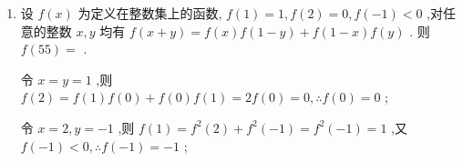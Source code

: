 \begin{enumerate}
\begin{jieda}
         令 $y = 1$ 得 $f\left( {x + 1}\right)  + f\left( {x - 1}\right)  = f\left( x\right) f\left( 1\right)  = f\left( x\right)$ ,
        
        所以 $f\left( {x + 1}\right)  = f\left( x\right)  - f\left( {x - 1}\right)$ ,则 $f\left( {x + 2}\right)  = f\left( {x + 1}\right)  - f\left( x\right)$ ,
        
        $f\left( {x + 3}\right)  = f\left( {x + 2}\right)  - f\left( {x + 1}\right)  =  - f\left( x\right) ,$
        
        
        
        所以 $f\left( {x + 6}\right)  = f\left( {x + 3 + 3}\right)  =  - f\left( {x + 3}\right)  =  - \left( {-f\left( x\right) }\right)  = f\left( x\right)$ ,
        
        所以 $f\left( x\right)$ 是周期为 6 的周期函数.
        
        令 $x = 1,y = 0$ ,则 $f\left( 1\right)  + f\left( 1\right)  = f\left( 1\right) f\left( 0\right) ,f\left( 0\right)  = 2$ ,
        
        $f\left( 2\right)  = f\left( 1\right)  - f\left( 0\right)  =  - 1,f\left( 3\right)  = f\left( 2\right)  - f\left( 1\right)  =  - 2,$
        
        $f\left( 4\right)  = f\left( 3\right)  - f\left( 2\right)  =  - 1,f\left( 5\right)  = f\left( 4\right)  - f\left( 3\right)  = 1$ ,
        
        $f\left( 6\right)  = f\left( 5\right)  - f\left( 4\right)  = 2$ ,所以 $f\left( 1\right)  + f\left( 2\right)  + f\left( 3\right)  + f\left( 4\right)  + f\left( 5\right)  + f\left( 6\right)  = 0$ ,
        
        因为 ${2024} = {337} \times  6 + 2$ ,所以 $\mathop{\sum }\limits_{{k = 1}}^{{2024}}f\left( k\right)  = f\left( 1\right)  + f\left( 2\right)  = 0$ .
    \end{jieda}
    \item 设 $f\left( x\right)$ 为定义在整数集上的函数, $f\left( 1\right)  = 1,f\left( 2\right)  = 0,f\left( {-1}\right)  < 0$ ,对任意的整数 $x,y$ 均有 $f\left( {x + y}\right)  = f\left( x\right) f\left( {1 - y}\right)  + f\left( {1 - x}\right) f\left( y\right)$ . 则 $f\left( {55}\right)  =$ .
    \begin{jieda}
        令 $x = y = 1$ ,则 $f\left( 2\right)  = f\left( 1\right) f\left( 0\right)  + f\left( 0\right) f\left( 1\right)  = {2f}\left( 0\right)  = 0,\therefore f\left( 0\right)  = 0$ ;
        
        令 $x = 2,y =  - 1$ ,则 $f\left( 1\right)  = {f}^{2}\left( 2\right)  + {f}^{2}\left( {-1}\right)  = {f}^{2}\left( {-1}\right)  = 1$ ,又 $f\left( {-1}\right)  < 0,\therefore f\left( {-1}\right)  =  - 1$ ;
        

\end{jieda}
\end{enumerate}
